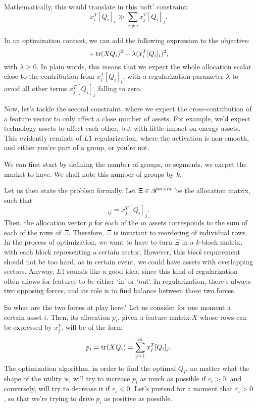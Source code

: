Mathematically, this would translate in this `soft' constraint:
\begin{equation}
  x_i^{T}[Q_i]_i \gg \sum_{j\neq i}x_j^{T}[Q_i]_j.
\end{equation}

In an optimization context, we can add the following expression to the objective:
\begin{equation}
  +\operatorname{tr}(XQ_i)^2 - \lambda(x_i^T[Q_i]_i)^2,
\end{equation}
with $\lambda \geq0$. In plain words, this means that we expect the whole allocation
scalar close to the contribution from $x_i^T[Q_i]_i$, with a regularization parameter
$\lambda$ to avoid all other terms $x_j^{T}[Q_i]_j$ falling to zero. 

Now, let's tackle the second constraint, where we expect the cross-contribution of a
feature vector to only affect a close number of assets. For example, we'd expect
technology assets to affect each other, but with little impact on energy assets. This
evidently reminds of $L1$ regularization, where the activation is non-smooth, and either
you're part of a group, or you're not. 

We can first start by defining the number of groups, or segments, we exepct the market to
have. We shall note this number of groups by $k$. 

Let us then state the problem formally. Let $\Xi \in \mathscr{R}^{m\times{}m}$ be the allocation
matrix, such that
\begin{equation}
  [\Xi]_{ij} = x_{j}^{T}[Q_i]_j.
\end{equation}
Then, the allocation vector $p$ for each of the $m$ assets corresponds to the sum of each
of the rows of $\Xi$. Therefore, $\Xi$ is invariant to reordering of individual rows. In
the process of optimization, we want to have to turn $\Xi$ in a $k$-block matrix, with
each block representing a certain sector. However, this \textit{block} requirement should
not be too hard, as in certain event, we could have assets with overlapping
sectors. Anyway, $L1$ sounds like a good idea, since this kind of regularization often
allows for features to be either `in' or `out'. In regularization, there's always two
opposing forces, and its role is to find balance between those two forces. 

So what are the two forces at play here? Let us consider for one moment a certain asset
$i$. Then, its allocation $p_i$, given a feature matrix $X$ whose rows can be expressed by
$x_j^{T}$, will be of the form
\begin{equation}
  p_i = \operatorname{tr}(XQ_i) = \sum_{j=1}^m x_j^{T}[Q_i]_j.
\end{equation}
The optimization algorithm, in order to find the optimal $Q_i$, no matter what the shape
of the utility is, will try to increase $p_i$ as much as possible if $r_i>0$, and
conversely, will try to decrease it if $r_i<0$. Let's pretend for a moment that $r_i>0$,
so that we're trying to drive $p_i$ as positive as possible. 

